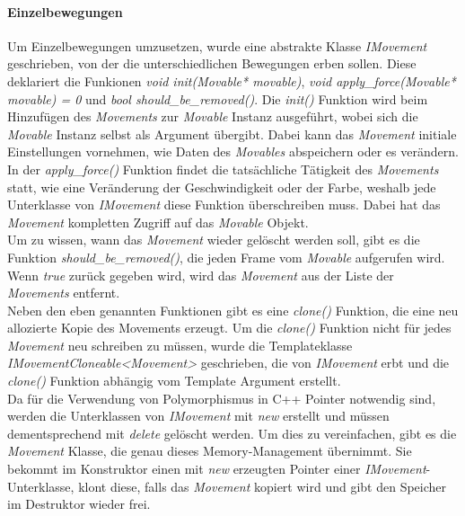 \documentclass[11pt,a4paper]{article}
\begin{document}
\paragraph{Einzelbewegungen}
Um Einzelbewegungen umzusetzen, wurde eine abstrakte Klasse \textit{IMovement} geschrieben, von der die unterschiedlichen Bewegungen erben sollen. Diese deklariert die Funkionen \textit{void init(Movable* movable)}, \textit{void apply\_force(Movable* movable) = 0} und \textit{bool should\_be\_removed()}. Die \textit{init()} Funktion wird beim Hinzufügen des \textit{Movements} zur \textit{Movable} Instanz ausgeführt, wobei sich die \textit{Movable} Instanz selbst als Argument übergibt. Dabei kann das \textit{Movement} initiale Einstellungen vornehmen, wie Daten des \textit{Movables} abspeichern oder es verändern.\\
In der \textit{apply\_force()} Funktion findet die tatsächliche Tätigkeit des \textit{Movements} statt, wie eine Veränderung der Geschwindigkeit oder der Farbe, weshalb jede Unterklasse von \textit{IMovement} diese Funktion überschreiben muss. Dabei hat das \textit{Movement} kompletten Zugriff auf das \textit{Movable} Objekt.\\
Um zu wissen, wann das \textit{Movement} wieder gelöscht werden soll, gibt es die Funktion \textit{should\_be\_removed()}, die jeden Frame vom \textit{Movable} aufgerufen wird. Wenn \textit{true} zurück gegeben wird, wird das \textit{Movement} aus der Liste der \textit{Movements} entfernt.\\
Neben den eben genannten Funktionen gibt es eine \textit{clone()} Funktion, die eine neu allozierte Kopie des Movements erzeugt. Um die \textit{clone()} Funktion nicht für jedes \textit{Movement} neu schreiben zu müssen, wurde die Templateklasse \textit{IMovementCloneable\textless Movement\textgreater} geschrieben, die von \textit{IMovement} erbt und die \textit{clone()} Funktion abhängig vom Template Argument erstellt.\\
Da für die Verwendung von Polymorphismus in C++ Pointer notwendig sind, werden die Unterklassen von \textit{IMovement} mit \textit{new} erstellt und müssen dementsprechend mit \textit{delete} gelöscht werden. Um dies zu vereinfachen, gibt es die \textit{Movement} Klasse, die genau dieses Memory-Management übernimmt. Sie bekommt im Konstruktor einen mit \textit{new} erzeugten Pointer einer \textit{IMovement}-Unterklasse, klont diese, falls das \textit{Movement} kopiert wird und gibt den Speicher im Destruktor wieder frei.
\end{document}
